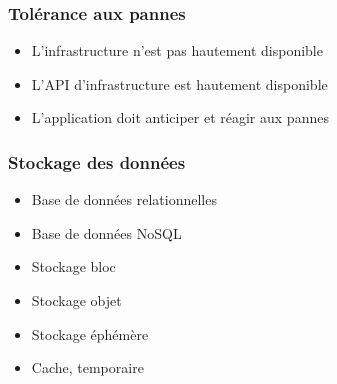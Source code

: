   \begin{frame}
    \frametitle{Tolérance aux pannes}
    \begin{itemize}
      \item L'infrastructure n'est pas hautement disponible
      \item L'API d'infrastructure est hautement disponible
      \item L'application doit anticiper et réagir aux pannes
    \end{itemize}
  \end{frame}

  \begin{frame}
    \frametitle{Stockage des données}
    \begin{itemize}
      \item Base de données relationnelles
      \item Base de données NoSQL
      \item Stockage bloc
      \item Stockage objet
      \item Stockage éphémère
      \item Cache, temporaire
    \end{itemize}
  \end{frame}

